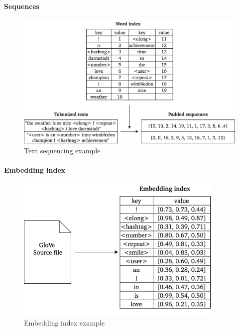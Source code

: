 \paragraph{Sequences}
\label{sub:sequences}

\begin{figure}[h]
  \includegraphics[width=\textwidth]{img/text_preprocessing_3}
  \caption{Text sequencing example}
\label{fig:text_sequencing}
\end{figure}


\paragraph{Embedding index}
\label{sub:embedding_index}

\begin{figure}[h]
  \includegraphics[height=7cm]{img/text_preprocessing_4}
  \caption{Embedding index example}
\label{fig:embedding_index}
\end{figure}

